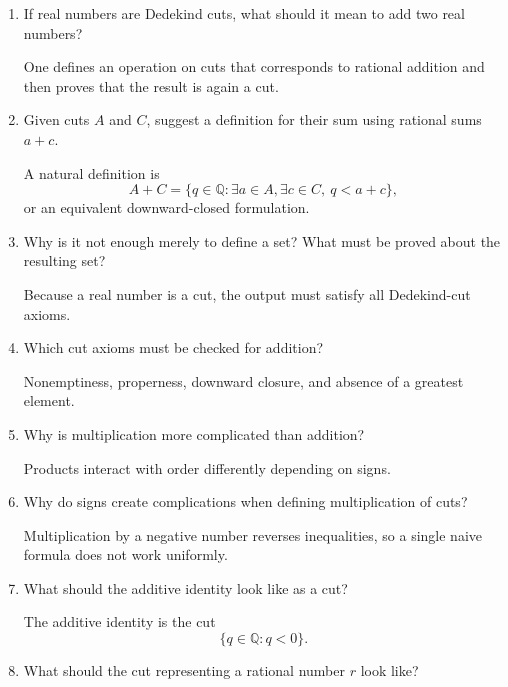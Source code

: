 \documentclass{self-check}
\begin{document}
\begin{enumerate}[label=\arabic{*}., itemsep=10pt]
  \item If real numbers are Dedekind cuts, what should it mean to add two real numbers?

    \begin{answer}
      One defines an operation on cuts that corresponds to rational addition and then proves that the result is again a cut.
    \end{answer}
  \item Given cuts \(A\) and \(C\), suggest a definition for their sum using rational sums \(a+c\).

    \begin{answer}
      A natural definition is
      \[ A+C=\{q\in\mathbb{Q}:\exists a\in A,\exists c\in C,\ q<a+c\}, \]
      or an equivalent downward-closed formulation.
    \end{answer}
  \item Why is it not enough merely to define a set? What must be proved about the resulting set?

    \begin{answer}
      Because a real number is a cut, the output must satisfy all Dedekind-cut axioms.
    \end{answer}
  \item Which cut axioms must be checked for addition?

    \begin{answer}
      Nonemptiness, properness, downward closure, and absence of a greatest element.
    \end{answer}
  \item Why is multiplication more complicated than addition?

    \begin{answer}
      Products interact with order differently depending on signs.
    \end{answer}
  \item Why do signs create complications when defining multiplication of cuts?

    \begin{answer}
      Multiplication by a negative number reverses inequalities, so a single naive formula does not work uniformly.
    \end{answer}
  \item What should the additive identity look like as a cut?

    \begin{answer}
      The additive identity is the cut
      \[ \{q\in\mathbb{Q}:q<0\}. \]
    \end{answer}
  \item What should the cut representing a rational number \(r\) look like?


\end{enumerate}
\end{document}
